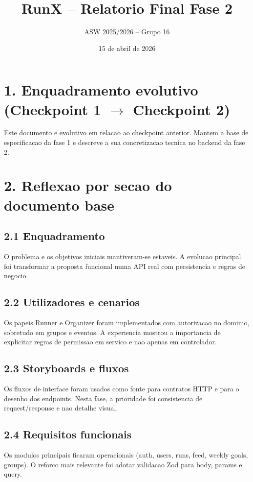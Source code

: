 \documentclass[11pt,a4paper]{article}
\title{RunX -- Relatorio Final Fase 2}
\author{ASW 2025/2026 -- Grupo 16}
\date{15 de abril de 2026}
\begin{document}
\maketitle

\section*{1. Enquadramento evolutivo (Checkpoint 1 $\rightarrow$ Checkpoint 2)}

Este documento e evolutivo em relacao ao checkpoint anterior. Mantem a base de especificacao da fase 1 e descreve a sua concretizacao tecnica no backend da fase 2.

\section*{2. Reflexao por secao do documento base}

\subsection*{2.1 Enquadramento}
O problema e os objetivos iniciais mantiveram-se estaveis. A evolucao principal foi transformar a proposta funcional numa API real com persistencia e regras de negocio.

\subsection*{2.2 Utilizadores e cenarios}
Os papeis Runner e Organizer foram implementados com autorizacao no dominio, sobretudo em grupos e eventos. A experiencia mostrou a importancia de explicitar regras de permissao em servico e nao apenas em controlador.

\subsection*{2.3 Storyboards e fluxos}
Os fluxos de interface foram usados como fonte para contratos HTTP e para o desenho dos endpoints. Nesta fase, a prioridade foi consistencia de request/response e nao detalhe visual.

\subsection*{2.4 Requisitos funcionais}
Os modulos principais ficaram operacionais (auth, users, runs, feed, weekly goals, groups). O reforco mais relevante foi adotar validacao Zod para body, params e query.
\end{document}
